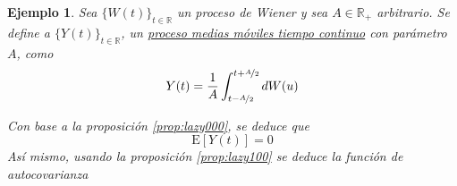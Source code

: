 \documentclass[12pt,letterpaper]{book}
\newtheorem{ejemplo}{Ejemplo}[chapter]
\newcommand{\R}{\mathbb{R}}
\newcommand{\E}[1]{\mathrm{E}\left[ #1 \right]}
\newcommand{\pheq}{\phantom{=}}
\begin{document}
\begin{ejemplo}
Sea $\{ W(t)\}_{t\in\R}$ un proceso de Wiener y sea $A\in\R_+$ arbitrario. Se define a $\{Y(t)\}_{t\in\R}$, un \underline{proceso medias m\'oviles tiempo continuo} con parámetro $A$, como
\begin{equation}
Y(t) = \frac{1}{A}\int_{t-\nicefrac{A}{2}}^{t+\nicefrac{A}{2}} dW(u)
\end{equation}

Con base a la proposición \ref{prop:lazy000}, se deduce que
\begin{equation}
\E{Y(t)} = 0
\end{equation}
Así mismo, usando la proposición \ref{prop:lazy100} se deduce la función de autocovarianza

\end{ejemplo}
\end{document}
